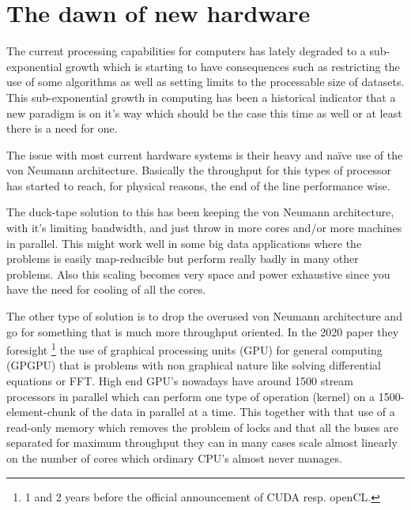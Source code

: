 \documentclass{article}
\begin{document}


\section{The dawn of new hardware}
    The current processing capabilities for computers has lately degraded to a
    sub-exponential growth which is starting to have consequences such as 
    restricting the use of some algorithms as well as setting limits 
    to the processable size of datasets.
    This sub-exponential growth in computing has been a historical indicator
    that a new paradigm is on it's way which should be the case this time as
    well or at least there is a need for one.%
    
    The issue with most current hardware systems is their heavy and na\"{i}ve use of the von
    Neumann architecture. Basically the throughput for this types of processor
    has started to reach, for physical reasons, the end of the line 
    performance wise.

    The duck-tape solution to this has been keeping the von Neumann
    architecture, with it's limiting bandwidth, and just throw in more cores and/or more machines in parallel.
    This might work well in some big data applications where the problems is easily
    map-reducible but perform really badly in many other
    problems.\cite{mapreduce} Also
    this scaling becomes very space and power exhaustive since you have the need for
    cooling of all the cores. 

    The other type of solution is to drop the overused von Neumann architecture
    and go for something that is much more throughput oriented. In the 2020
    paper\cite{ms2020} they foresight
    \footnote{1 and 2 years before the official 
    announcement of CUDA resp. openCL.} 
    the use of graphical processing units
    (GPU) for general computing (GPGPU) that is problems with non graphical nature like
    solving differential equations or FFT. High end GPU's nowadays have around
    1500 stream processors in parallel which can perform one type of operation
    (kernel)
    on a 1500-element-chunk of the data in parallel at a time. This together
    with that use 
    of a read-only memory which removes the problem of locks
    and that all the buses are separated for
    maximum throughput they can in many cases  scale almost linearly 
    on the number of cores
    which ordinary CPU's almost never manages.
\end{document}
